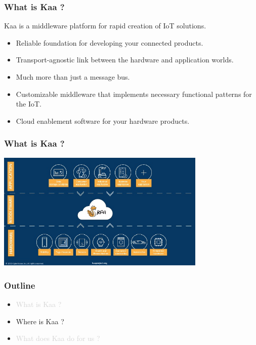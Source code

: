 \documentclass{beamer}
\begin{document}
\begin{frame}
	\frametitle{What is Kaa ?}
	\centering Kaa is a middleware platform for rapid creation of IoT solutions.
	\vspace{1cm}
	\begin{itemize}
		\item Reliable foundation for developing your connected products.
		\item \textcolor{TextGreen}{Transport-agnostic} link between the hardware and application worlds.
		\item Much more than just a message bus.
		\item \textcolor{TextOrange}{Customizable} middleware that implements necessary functional patterns for the IoT.
		\item \textcolor{Ocean}{Cloud enablement} software for your hardware products.
	\end{itemize}
\end{frame}

\begin{frame}
	\frametitle{What is Kaa ?}
	\centering\includegraphics[width=10cm]{diags/kaa-arch-1.jpg}
\end{frame}

\begin{frame}
	\frametitle{Outline}
	\begin{itemize}
		\item \textcolor{LightGray}{What is Kaa ?}
		\item Where is Kaa ?
		\item \textcolor{LightGray}{What does Kaa do for us ?}
	\end{itemize}
\end{frame}
\end{document}
